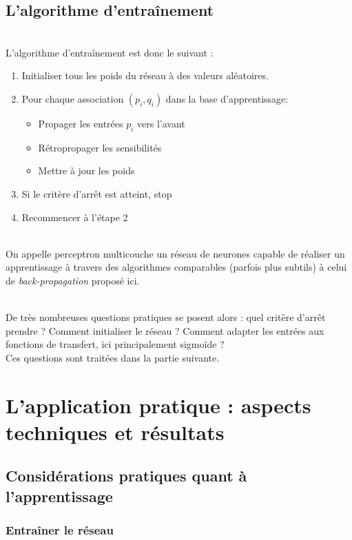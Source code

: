 \documentclass[a4paper, 11pt]{article}
\begin{document}
\subsection{L'algorithme d'entraînement}

\\ L'algorithme d'entraînement est donc le suivant : 

\begin{enumerate}

\item Initialiser tous les poids du réseau à des valeurs aléatoires.
\item Pour chaque association $(p_i,q_i)$ dans la base d’apprentissage:
\begin{itemize}
	\item Propager les entrées $p_i$ vers l'avant
	\item Rétropropager les sensibilités
	\item Mettre à jour les poids
\end{itemize}
\item Si le critère d'arrêt est atteint, stop
\item Recommencer à l'étape 2
\end{enumerate}


\\On appelle perceptron multicouche un réseau de neurones capable de réaliser un apprentissage à travers des algorithmes comparables (parfois plus subtils) à celui de \emph{back-propagation} proposé ici.

\\De très nombreuses questions pratiques se posent alors : quel critère d'arrêt prendre ? Comment initialiser le réseau ? Comment adapter les entrées aux fonctions de transfert, ici principalement sigmoïde ?
\\Ces questions sont traitées dans la partie suivante.

\section{L'application pratique : aspects techniques et résultats}

\subsection{Considérations pratiques quant à l'apprentissage}
	\subsubsection{Entraîner le réseau}
\end{document}
